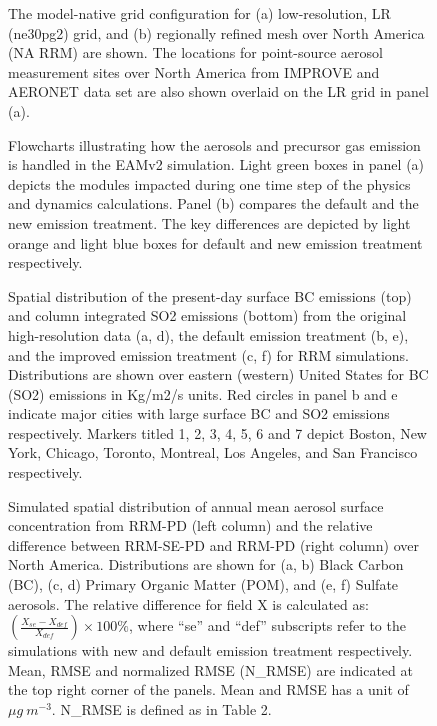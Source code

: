 \documentclass[journal abbreviation, manuscript]{copernicus}
\begin{document}
\clearpage
\begin{figure}[t]
\caption{The model-native grid configuration for (a) low-resolution, LR (ne30pg2) grid, and (b) regionally refined mesh over North America (NA RRM) are shown. The locations for point-source aerosol measurement sites over North America from IMPROVE and AERONET data set are also shown overlaid on the LR grid in panel (a).}
\end{figure}

\clearpage
\begin{figure}[t]
\caption{Flowcharts illustrating how the aerosols and precursor gas emission is handled in the EAMv2 simulation. Light green boxes in panel (a) depicts the modules impacted during one time step of the physics and dynamics calculations. Panel (b) compares the default and the new emission treatment. The key differences are depicted by light orange and light blue boxes for default and new emission treatment respectively.}
\end{figure}

\clearpage
\begin{figure}[t]
\caption{Spatial distribution of the present-day surface BC emissions (top) and column integrated SO2 emissions (bottom) from the original high-resolution data (a, d), the default emission treatment (b, e), and the improved emission treatment (c, f) for RRM simulations. Distributions are shown over eastern (western) United States for BC (SO2) emissions in Kg/m2/s units. Red circles in panel b and e indicate major cities with large surface BC and SO2 emissions respectively. Markers titled 1, 2, 3, 4, 5, 6 and 7 depict Boston, New York, Chicago, Toronto, Montreal, Los Angeles, and San Francisco respectively.}
\end{figure}

\clearpage
\begin{figure}[t]
\caption{Simulated spatial distribution of annual mean aerosol surface concentration from RRM-PD (left column) and the relative difference between RRM-SE-PD and RRM-PD (right column) over North America. Distributions are shown for (a, b) Black Carbon (BC), (c, d) Primary Organic Matter (POM), and (e, f) Sulfate aerosols. The relative difference for field X is calculated as: $(\frac{X_{se}-X_{def}}{X_{def}}) \times 100 \%$, where “se” and “def” subscripts refer to the simulations with new and default emission treatment respectively. Mean, RMSE and normalized RMSE (N\_RMSE) are indicated at the top right corner of the panels. Mean and RMSE has a unit of $\mu{g}\ m^{-3}$. N\_RMSE is defined as in Table 2.}
\end{figure}
\end{document}
